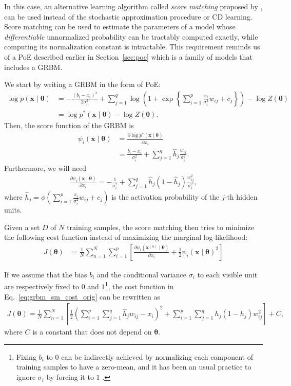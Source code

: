 \documentclass[dissertation,nocontribution,draft*]{aaltoseries}
\newcommand{\vect}[1]{\mathbf{#1}}
\newcommand{\vects}[1]{\boldsymbol{#1}}
\newcommand{\vx}[0]{\vect{x}}
\newcommand{\TT}[0]{{\vects{\theta}}}
\begin{document}
In this case, an alternative learning algorithm called
\textit{score matching} proposed by \citet{Hyvarinen2005},
can be used instead of the stochastic approximation
procedure or CD learning. Score matching can be used to
estimate the parameters of a model whose
\textit{differentiable} unnormalized probability can be
tractably computed exactly, while computing its
normalization constant is intractable. This requirement
reminds us of a PoE described earlier in
Section~\ref{sec:poe} which is a family of models that
includes a GRBM.

We start by writing a GRBM in the form of PoE:
\begin{align}
    \label{eq:grbm_poe}
    \log p(\vx \mid \TT) &= -\frac{(b_i - x_i)^2}{2\sigma_i^2}
    + \sum_{j=1}^q \log \left( 1 + \exp\left\{ \sum_{i=1}^p
    \frac{x_i}{\sigma_i^2} w_{ij} + c_j \right\}\right) -
    \log Z(\TT) 
    \nonumber \\
    &= \log p^*(\vx \mid \TT)  - \log Z(\TT).
\end{align}
Then, the score function of the GRBM is
\begin{align}
    \label{eq:grbm_score}
    \psi_i (\vx \mid \TT) &= \frac{\partial \log p^*(\vx \mid
    \TT)}{\partial x_i} 
    \nonumber \\
    &= \frac{b_i - x_i}{\sigma_i^2} + \sum_{j=1}^q \hat{h}_j
    \frac{w_{ij}}{\sigma_i^2}.
\end{align}
Furthermore, we will need
\begin{align}
    \label{eq:grbm_score_grad}
    \frac{\partial \psi_i(\vx \mid \TT)}{\partial x_i} =
    -\frac{1}{\sigma_i^2} + \sum_{j=1}^q \hat{h}_j (1 -
    \hat{h}_j) \frac{w_{ij}^2}{\sigma_i^2},
\end{align}
where $\hat{h}_j = \phi\left( \sum_{i=1}^p
\frac{x_i}{\sigma_i^2} w_{ij} + c_j \right)$ is the
activation probability of the $j$-th hidden units.

Given a set $D$ of $N$ training samples, the score matching
then tries to minimize the following cost function
instead of maximizing the marginal log-likelihood:
\begin{align}
    \label{eq:grbm_sm_cost_orig}
    J(\TT) &= \frac{1}{N} \sum_{n=1}^N \sum_{i=1}^p \left[
    \frac{\partial \psi_i(\vx^{(n)} \mid \TT)}{\partial x_i}
    + \frac{1}{2} \psi_i (\vx \mid \TT)^2
    \right]
\end{align}

If we assume that the bias $b_i$ and the conditional
variance $\sigma_i$ to each visible unit are respectively
fixed to $0$ and $1$\footnote{ Fixing $b_i$ to $0$ can be
indirectly achieved by normalizing each component of
training samples to have a zero-mean, and it has been an
usual practice to ignore $\sigma_i$ by forcing it to $1$
\citep[see, e.g.,][]{Hinton2012rbm}.  }, the cost function in
Eq.~\eqref{eq:grbm_sm_cost_orig} can be rewritten as
\begin{align*}
    J(\TT) = \frac{1}{N} \sum_{n=1}^N \left[ \frac{1}{2}
    \left( \sum_{i=1}^p \sum_{j=1}^q \hat{h}_j w_{ij} - x_i
    \right)^2 + \sum_{i=1}^p \sum_{j=1}^q h_j(1 - h_j)
    w_{ij}^2 \right] + C,
\end{align*}
where $C$ is a constant that does not depend on $\TT$.
\end{document}
